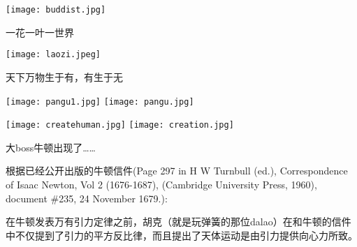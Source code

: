 \documentclass[CJK]{beamer}
\begin{document}
\begin{frame}
\bch
\begin{minipage}{0.45\textwidth}
\texttt{[image: buddist.jpg]}
\end{minipage}
\begin{minipage}{0.45\textwidth}
{\Large 一花一叶一世界}
\end{minipage}
\ech
\end{frame}


\begin{frame}
\bch
\begin{minipage}{0.45\textwidth}
\texttt{[image: laozi.jpeg]}
\end{minipage}
\begin{minipage}{0.45\textwidth}
{\Large 天下万物生于有，有生于无}
\end{minipage}
\ech
\end{frame}


\begin{frame}
\bch

\texttt{[image: pangu1.jpg]}
\emini
{}
\texttt{[image: pangu.jpg]}
\emini

\ech
\end{frame}

\begin{frame}
\bch
\texttt{[image: createhuman.jpg]}
\texttt{[image: creation.jpg]}
\ech
\end{frame}

\begin{frame}
  \bch
  {\Large
  大boss牛顿出现了……}
  \ech
\end{frame}


\begin{frame}
  \bch
  \ech
\end{frame}


\begin{frame}
  \bch
  \ech
\end{frame}

\begin{frame}
  \bch

  根据已经公开出版的牛顿信件{\scriptsize (Page 297 in H W Turnbull (ed.), Correspondence of Isaac Newton, Vol 2 (1676-1687), (Cambridge University Press, 1960), document \#235, 24 November 1679.)}:
  
  {\blue 在牛顿发表万有引力定律之前，胡克（就是玩弹簧的那位dalao）在和牛顿的信件中不仅提到了引力的平方反比律，而且提出了天体运动是由引力提供向心力所致。}

  \ech
\end{frame}
\end{document}
